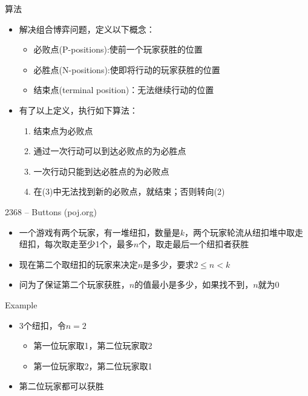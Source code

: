 \begin{frame}{算法}
    \begin{itemize}
        \item 解决组合博弈问题，定义以下概念：
        \begin{itemize}
            \item 必败点(P-positions):使前一个玩家获胜的位置
            \item 必胜点(N-positions):使即将行动的玩家获胜的位置
            \item 结束点(terminal position)：无法继续行动的位置
        \end{itemize}
        \item 有了以上定义，执行如下算法：
        \begin{enumerate}[(1)]
            \item 结束点为必败点
            \item 通过一次行动可以到达必败点的为必胜点
            \item 一次行动只能到达必胜点的为必败点
            \item 在(3)中无法找到新的必败点，就结束；否则转向(2)
        \end{enumerate}
    \end{itemize}
\end{frame}
\begin{frame}{2368 -- Buttons (poj.org)}
    \begin{itemize}
        \item 一个游戏有两个玩家，有一堆纽扣，数量是$k$，两个玩家轮流从纽扣堆中取走纽扣，每次取走至少1个，最多$n$个，取走最后一个纽扣者获胜
        \item 现在第二个取纽扣的玩家来决定$n$是多少，要求$2 \leq n < k$
        \item 问为了保证第二个玩家获胜，$n$的值最小是多少，如果找不到，$n$就为0
    \end{itemize}
    \begin{exampleblock}{Example}
        \begin{itemize}
            \item 3个纽扣，令$n=2$
            \begin{itemize}
                \item 第一位玩家取1，第二位玩家取2
                \item 第一位玩家取2，第二位玩家取1
            \end{itemize}
            \item 第二位玩家都可以获胜
        \end{itemize}
    \end{exampleblock}
\end{frame}
